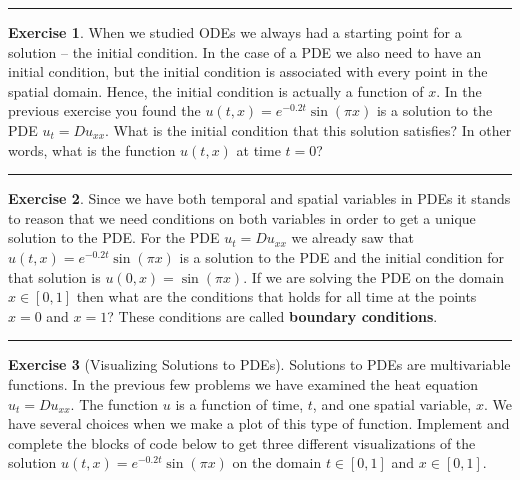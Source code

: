 \documentclass[
]{book}
\theoremstyle{definition}
\theoremstyle{definition}
\theoremstyle{definition}
\newtheorem{exercise}{Exercise}[chapter]
\theoremstyle{remark}
\begin{document}
\begin{center}\rule{0.5\linewidth}{0.5pt}\end{center}

\begin{exercise}
\protect\hypertarget{exr:unnamed-chunk-517}{}{\label{exr:unnamed-chunk-517} }When we studied ODEs we always had a starting point for a solution -- the initial condition. In the case of a PDE we also need to have an initial condition, but the initial condition is associated with every point in the spatial domain. Hence, the initial condition is actually a function of \(x\). In the previous exercise you found the \(u(t,x) = e^{-0.2t} \sin(\pi x)\) is a solution to the PDE \(u_t = D u_{xx}\). What is the initial condition that this solution satisfies? In other words, what is the function \(u(t,x)\) at time \(t=0\)?
\end{exercise}

\begin{center}\rule{0.5\linewidth}{0.5pt}\end{center}

\begin{exercise}
\protect\hypertarget{exr:unnamed-chunk-518}{}{\label{exr:unnamed-chunk-518} }Since we have both temporal and spatial variables in PDEs it stands to reason that we need conditions on both variables in order to get a unique solution to the PDE. For the PDE \(u_t = D u_{xx}\) we already saw that \(u(t,x) = e^{-0.2t} \sin(\pi x)\) is a solution to the PDE and the initial condition for that solution is \(u(0,x) = \sin(\pi x)\). If we are solving the PDE on the domain \(x \in [0,1]\) then what are the conditions that holds for all time at the points \(x=0\) and \(x=1\)? These conditions are called \textbf{boundary conditions}.
\end{exercise}

\begin{center}\rule{0.5\linewidth}{0.5pt}\end{center}

\begin{exercise}[Visualizing Solutions to PDEs]
\protect\hypertarget{exr:unnamed-chunk-519}{}{\label{exr:unnamed-chunk-519} {} }Solutions to PDEs are multivariable functions. In the previous few problems we have examined the heat equation \(u_t = D u_{xx}\). The function \(u\) is a function of time, \(t\), and one spatial variable, \(x\). We have several choices when we make a plot of this type of function. Implement and complete the blocks of code below to get three different visualizations of the solution \(u(t,x) = e^{-0.2t} \sin(\pi x)\) on the domain \(t \in [0,1]\) and \(x \in [0,1]\).
\end{exercise}
\end{document}
